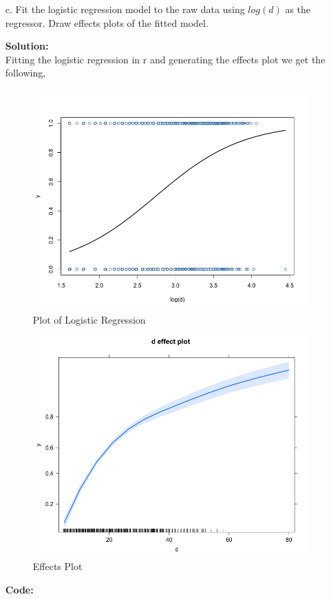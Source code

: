 \documentclass[12pt]{article}
\makeatletter
\theoremstyle{homework}
\newenvironment{exercise}[1]
{\def\@currentlabel{#1}\exercisecore}
{\endexercisecore}
\newcommand{\localhead}[1]{\par\smallskip\noindent\textbf{#1}\nobreak\\}%
\newcommand\solution{\localhead{Solution:}}
\makeatother
\begin{document}
\begin{exercise}{1}
\begin{enumerate}
    \item[c.] Fit the logistic regression model to the raw data using $log(d)$ as the regressor. Draw effects plots of the fitted model.
    \solution  Fitting the logistic regression in r and generating the effects plot we get the following, 
    \begin{figure}[H]
      \begin{center}
      \caption{Plot of Logistic Regression}
      \includegraphics[width = \textwidth]{Rplot.png}
      \end{center}
    \end{figure}
    \begin{figure}[H]
      \begin{center}
      \caption{Effects Plot}
      \includegraphics[width = \textwidth]{Rplot02.png}
      \end{center}
    \end{figure}
    \textbf{Code:}
    \begin{center}
    
    \end{center} 
    \newpage



\end{enumerate}
\end{exercise}
\end{document}
